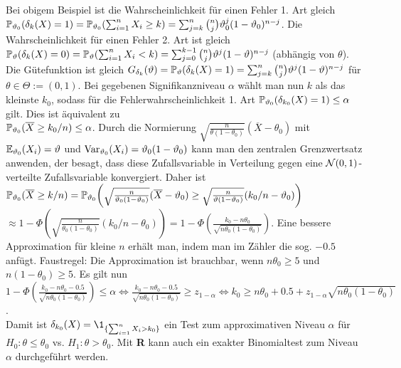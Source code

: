 \begin{Bsp}
    Bei obigem Beispiel ist die Wahrscheinlichkeit für einen Fehler 1. Art
    gleich\\
    $\mathbb{P}_{\vartheta_0}(\delta_k(X) = 1) = \mathbb{P}_{\vartheta_0}(\sum_{i=1}^n X_i \ge k)
    = \sum_{j=k}^n \binom{n}{j} \vartheta_0^j (1-\vartheta_0)^{n-j}$.
    Die Wahrscheinlichkeit für einen Fehler 2. Art ist gleich
    $\mathbb{P}_\vartheta(\delta_k(X) = 0) = \mathbb{P}_\vartheta(\sum_{i=1}^n X_i < k)
    = \sum_{j=0}^{k-1} \binom{n}{j} \vartheta^j (1-\vartheta)^{n-j}$
    (abhängig von $\theta$).
    Die Gütefunktion ist gleich $G_{\delta_k}(\vartheta) = \mathbb{P}_\vartheta(\delta_k(X) = 1)
    = \sum_{j=k}^n \binom{n}{j} \vartheta^j (1-\vartheta)^{n-j}$ für $\theta \in \Theta := (0, 1)$.
    Bei gegebenen Signifikanzniveau $\alpha$ wählt man nun $k$ als das kleinste $k_0$,
    sodass für die Fehlerwahrscheinlichkeit 1. Art
    $\mathbb{P}_{\vartheta_0}(\delta_{k_0}(X) = 1) \le \alpha$ gilt.
    Dies ist äquivalent zu\\
    $\mathbb{P}_{\vartheta_0}(\overline{X} \ge k_0/n) \le \alpha$.
    Durch die Normierung $\sqrt{\frac{n}{\theta(1-\theta_0)}} (\overline{X} - \theta_0)$
    mit $\mathbb{E}_{\vartheta_0}(X_i) = \vartheta$ und $\mathrm{Var}_{\vartheta_0}(X_i) = \vartheta_0(1-\vartheta_0)$ kann man
    den zentralen Grenzwertsatz anwenden, der besagt, dass diese Zufallsvariable in Verteilung
    gegen eine $\mathcal{N}(0,1)$-verteilte Zufallsvariable konvergiert.
    Daher ist\\
    $\mathbb{P}_{\vartheta_0}(\overline{X} \ge k/n)
    = \mathbb{P}_{\vartheta_0}\!\left(\sqrt{\frac{n}{\vartheta_0(1-\vartheta_0)}} (\overline{X} - \vartheta_0) \ge
    \sqrt{\frac{n}{\vartheta(1-\vartheta_0)}} (k_0/n - \vartheta_0)\right)$\\
    $\approx 1 - \Phi\!\left(\sqrt{\frac{n}{\theta_0(1-\theta_0)}} (k_0/n - \theta_0)\right)
    = 1 - \Phi\!\left(\frac{k_0 - n \theta_0}{\sqrt{n \theta_0(1-\theta_0)}}\right)$.
    Eine bessere Approximation für kleine $n$ erhält man, indem man im Zähler
    die sog.  $- \num{0.5}$ anfügt.
    Faustregel: Die Approximation ist brauchbar, wenn $n\theta_0 \ge 5$ und
    $n(1 - \theta_0) \ge 5$.
    Es gilt nun\\
    $1 - \Phi\!\left(\frac{k_0 - n \theta_0 - \num{0.5}}
    {\sqrt{n \theta_0(1-\theta_0)}}\right) \le \alpha
    \iff \frac{k_0 - n \theta_0 - \num{0.5}}{\sqrt{n \theta_0(1-\theta_0)}} \ge z_{1-\alpha}
    \iff k_0 \ge n\theta_0 + \num{0,5} + z_{1-\alpha} \sqrt{n \theta_0(1-\theta_0)}$.\\
    Damit ist $\delta_{k_0}(X) = \1_{\{\sum_{i=1}^n X_i > k_0\}}$ ein Test zum approximativen
    Niveau $\alpha$ für $H_0\colon \theta \le \theta_0$ vs. $H_1\colon \theta > \theta_0$.
    Mit \textbf{R} kann auch ein exakter Binomialtest zum Niveau $\alpha$ durchgeführt werden.
\end{Bsp}

